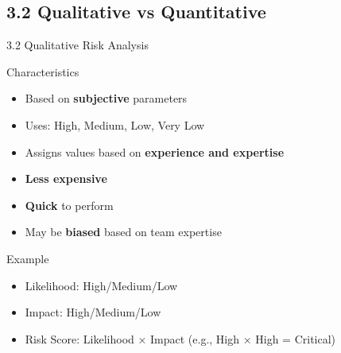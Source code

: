 \documentclass[9pt]{beamer}  %
\begin{document}
	\subsection{3.2 Qualitative vs Quantitative}
	\begin{frame}{3.2 Qualitative Risk Analysis}
		\begin{block}{Characteristics}
			\begin{itemize}
				\item Based on \textbf{subjective} parameters
				\item Uses: High, Medium, Low, Very Low
				\item Assigns values based on \textbf{experience and expertise}
				\item \textbf{Less expensive}
				\item \textbf{Quick} to perform
				\item May be \textbf{biased} based on team expertise
			\end{itemize}
		\end{block}
		
		\begin{block}{Example}
			\begin{itemize}
				\item Likelihood: High/Medium/Low
				\item Impact: High/Medium/Low
				\item Risk Score: Likelihood × Impact (e.g., High × High = Critical)
			\end{itemize}
		\end{block}
	\end{frame}
	
\end{document}
